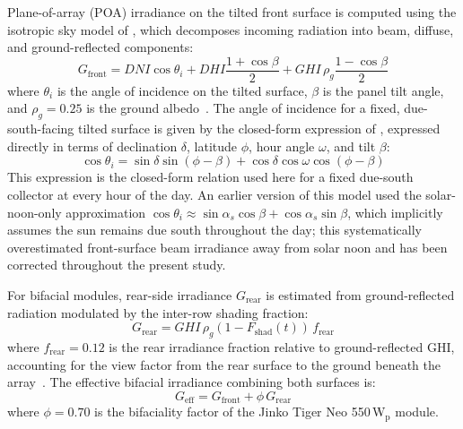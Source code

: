 \hspace{1cm}Plane-of-array (POA) irradiance on the tilted front surface
is computed using the isotropic sky model of \citet{liu1960}, which
decomposes incoming radiation into beam, diffuse, and ground-reflected
components:
\begin{equation}
    G_{\text{front}} = DNI\cos\theta_i
        + DHI\frac{1+\cos\beta}{2}
        + GHI\,\rho_g\frac{1-\cos\beta}{2}
    \label{eq:poa}
\end{equation}
where $\theta_i$ is the angle of incidence on the tilted surface,
$\beta$ is the panel tilt angle, and $\rho_g = 0.25$ is the ground
albedo~\citep{monteith2008}. The angle of incidence for a fixed,
due-south-facing tilted surface is given by the closed-form
expression of \citet{duffie2013}, expressed directly in terms of
declination $\delta$, latitude $\phi$, hour angle $\omega$, and
tilt $\beta$:
\begin{equation}
    \cos\theta_i = \sin\delta\sin(\phi-\beta)
        + \cos\delta\cos\omega\cos(\phi-\beta)
    \label{eq:aoi}
\end{equation}
This expression is the closed-form relation used here for a fixed due-south collector at every
hour of the day. An earlier version of this model used the
solar-noon-only approximation
$\cos\theta_i \approx \sin\alpha_s\cos\beta + \cos\alpha_s\sin\beta$,
which implicitly assumes the sun remains due south throughout the
day; this systematically overestimated front-surface beam
irradiance away from solar noon and has been corrected throughout
the present study.

For bifacial modules, rear-side irradiance $G_{\text{rear}}$ is
estimated from ground-reflected radiation modulated by the inter-row
shading fraction:
\begin{equation}
    G_{\text{rear}} = GHI\,\rho_g
        \left(1 - F_{\text{shad}}(t)\right)\,f_{\text{rear}}
    \label{eq:grear}
\end{equation}
where $f_{\text{rear}} = 0.12$ is the rear irradiance fraction
relative to ground-reflected GHI, accounting for the view factor
from the rear surface to the ground beneath the
array~\citep{gorjian2022}. The effective bifacial irradiance
combining both surfaces is:
\begin{equation}
    G_{\text{eff}} = G_{\text{front}}
        + \phi\,G_{\text{rear}}
    \label{eq:geff}
\end{equation}
where $\phi = 0.70$ is the bifaciality factor of the Jinko Tiger
Neo 550\,W$_{\text{p}}$ module.

